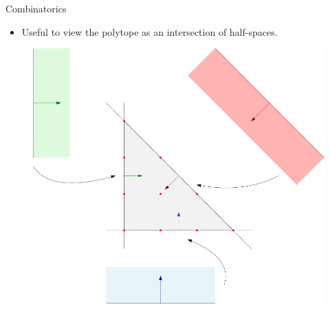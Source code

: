 \begin{frame}{Combinatorics}

    \begin{itemize}
       \item Useful to view the polytope as an intersection of half-spaces.
    \end{itemize}

    \begin{figure}
        \includegraphics[scale=0.25]{resources/half-spaces.png}
    \end{figure}

\end{frame}